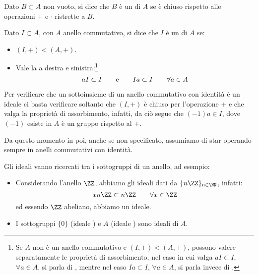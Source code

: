 \documentclass[11pt]{scrartcl}
\begin{document}
\begin{definition}
    Dato $B \subset A$ non vuoto, si dice che $B$ è un  di $A$ se è chiuso rispetto alle operazioni $+$ e $\cdot$ ristrette a $B$.
\end{definition}

\begin{definition}
    Dato $I \subset A$, con $A$ anello commutativo, si dice che $I$ è un  di $A$ se:
    \begin{itemize}
        \item $(I,+) < (A,+)$.
        \item Vale la  a destra e sinistra:\footnote{Se $A$ non è un anello commutativo e $(I,+) < (A,+)$, possono
        valere separatamente le proprietà di assorbimento, nel caso in cui valga $aI \subset I$, $\forall a \in A$, si parla di , mentre nel caso 
        $Ia \subset I$, $\forall a \in A$, si parla invece di .}
            \[ aI \subset I \qquad \text e \qquad Ia \subset I \qquad \forall a \in A
                \]
    \end{itemize}
\end{definition}

\begin{remark}
    Per verificare che un sottoinsieme di un anello commutativo con identità è un ideale ci basta verificare soltanto che $(I,+)$ è chiuso per l'operazione $+$ e che valga la proprietà di assorbimento, infatti, da ciò segue 
    che $(-1)a \in I$, dove $(-1)$ esiste in $A$ è un gruppo rispetto al $+$.
\end{remark}

Da questo momento in poi, anche se non specificato, assumiamo di star operando sempre in anelli commutativi con identità.

\begin{example}[Ideali]
    Gli ideali vanno ricercati tra i sottogruppi di un anello, ad esempio:
    \begin{itemize}
        \item Considerando l'anello $\ZZ$, abbiamo gli ideali dati da $\{n\ZZ\}_{n \in \NN}$, infatti:
            \[ xn\ZZ \subset n\ZZ \qquad \forall x \in \ZZ
                \]
        ed essendo $\ZZ$ abeliano, abbiamo un ideale.
        \item I sottogruppi $\{0\}$ (ideale ) e $A$ (ideale ) sono ideali di $A$.
    \end{itemize}
\end{example}
\end{document}
